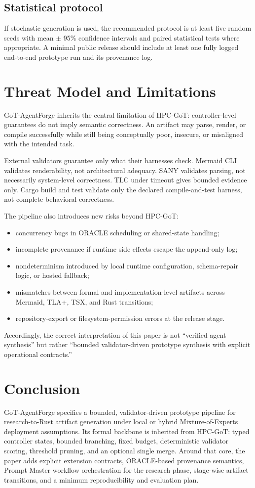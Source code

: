 \documentclass[11pt,a4paper,oneside]{article}
\begin{document}
\subsection{Statistical protocol}
If stochastic generation is used, the recommended protocol is at least five random seeds with mean $\pm$ 95\% confidence intervals and paired statistical tests where appropriate. A minimal public release should include at least one fully logged end-to-end prototype run and its provenance log.

\section{Threat Model and Limitations}
GoT-AgentForge inherits the central limitation of HPC-GoT: controller-level guarantees do not imply semantic correctness. An artifact may parse, render, or compile successfully while still being conceptually poor, insecure, or misaligned with the intended task.

External validators guarantee only what their harnesses check. Mermaid CLI validates renderability, not architectural adequacy. SANY validates parsing, not necessarily system-level correctness. TLC under timeout gives bounded evidence only. Cargo build and test validate only the declared compile-and-test harness, not complete behavioral correctness.

The pipeline also introduces new risks beyond HPC-GoT:
\begin{itemize}[leftmargin=2em]
    \item concurrency bugs in ORACLE scheduling or shared-state handling;
    \item incomplete provenance if runtime side effects escape the append-only log;
    \item nondeterminism introduced by local runtime configuration, schema-repair logic, or hosted fallback;
    \item mismatches between formal and implementation-level artifacts across Mermaid, TLA+, TSX, and Rust transitions;
    \item repository-export or filesystem-permission errors at the release stage.
\end{itemize}

Accordingly, the correct interpretation of this paper is not ``verified agent synthesis'' but rather ``bounded validator-driven prototype synthesis with explicit operational contracts.''

\section{Conclusion}
GoT-AgentForge specifies a bounded, validator-driven prototype pipeline for research-to-Rust artifact generation under local or hybrid Mixture-of-Experts deployment assumptions. Its formal backbone is inherited from HPC-GoT: typed controller states, bounded branching, fixed budget, deterministic validator scoring, threshold pruning, and an optional single merge. Around that core, the paper adds explicit extension contracts, ORACLE-based provenance semantics, Prompt Master workflow orchestration for the research phase, stage-wise artifact transitions, and a minimum reproducibility and evaluation plan.
\end{document}
